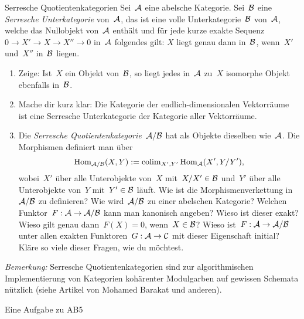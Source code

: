 \documentclass{uebblatt}
\begin{document}
\begin{aufgabe}{Serresche Quotientenkategorien}
Sei~$\mathcal{A}$ eine abelsche Kategorie. Sei~$\mathcal{B}$ eine \emph{Serresche Unterkategorie}
von~$\mathcal{A}$, das ist eine volle Unterkategorie~$\mathcal{B}$ von~$\mathcal{A}$, welche das Nullobjekt von~$\mathcal{A}$
enthält und für jede kurze exakte Sequenz~$0 \to X' \to X \to X'' \to 0$
in~$\mathcal{A}$ folgendes gilt: $X$ liegt genau dann in~$\mathcal{B}$, wenn~$X'$ und~$X''$
in~$\mathcal{B}$ liegen.
\begin{enumerate}
\item Zeige: Ist~$X$ ein Objekt von~$\mathcal{B}$, so liegt jedes in~$\mathcal{A}$ zu~$X$ isomorphe
Objekt ebenfalls in~$\mathcal{B}$.
\item Mache dir kurz klar: Die Kategorie der endlich-dimensionalen
Vektorräume ist eine Serresche Unterkategorie der Kategorie aller Vektorräume.
\item Die \emph{Serresche Quotientenkategorie}~$\mathcal{A}/\mathcal{B}$ hat als Objekte
dieselben wie~$\mathcal{A}$. Die Morphismen definiert man über
\[ \mathrm{Hom}_{\mathcal{A}/\mathcal{B}}(X,Y) := \operatorname{colim}_{X',Y'} \mathrm{Hom}_{\mathcal{A}}(X', Y/Y'), \]
wobei~$X'$ über alle Unterobjekte von~$X$ mit~$X/X' \in \mathcal{B}$ und~$Y'$ über alle
Unterobjekte von~$Y$ mit~$Y' \in \mathcal{B}$ läuft. Wie ist die Morphismenverkettung
in~$\mathcal{A}/\mathcal{B}$ zu definieren? Wie wird~$\mathcal{A}/\mathcal{B}$ zu einer abelschen Kategorie?
Welchen Funktor~$F : \mathcal{A} \to \mathcal{A}/\mathcal{B}$ kann man kanonisch angeben? Wieso ist dieser
exakt? Wieso gilt genau dann~$F(X) = 0$, wenn~$X \in \mathcal{B}$? Wieso ist~$F : \mathcal{A} \to
\mathcal{A}/\mathcal{B}$ unter allen exakten Funktoren~$G : \mathcal{A} \to \mathcal{C}$ mit dieser Eigenschaft
initial? Kläre so viele dieser Fragen, wie du möchtest.
\end{enumerate}
\emph{Bemerkung:} Serresche Quotientenkategorien sind zur algorithmischen
Implementierung von Kategorien kohärenter Modulgarben auf gewissen Schemata
nützlich (siehe Artikel von Mohamed Barakat und anderen).
\end{aufgabe}

Eine Aufgabe zu AB5
\end{document}
